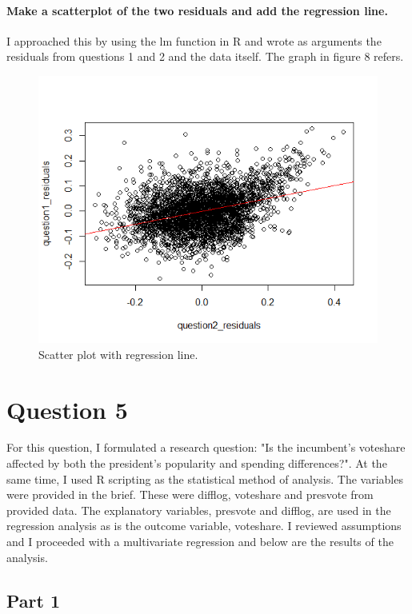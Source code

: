 \documentclass{article}
\begin{document}
\paragraph{Make a scatterplot of the two residuals and add the regression line.}
I approached this by using the lm function in R and wrote as arguments the residuals from questions 1 and 2 and the data itself. The graph in figure 8 refers.
\begin{figure}[h!]
	\centering
	\includegraphics[width=0.9\linewidth]{Question 4 - Scatter Plot with regression line.png}
	\caption{Scatter plot with regression line.}
	\label{fig:Scatter plot with regression line}
\end{figure}



	\section{Question 5}

For this question, I formulated a research question: "Is the incumbent's voteshare affected by both the president's popularity and spending differences?". At the same time, I used R scripting as the statistical method of analysis. The variables were provided in the brief. These were difflog, voteshare and presvote from provided data. The explanatory variables, presvote and difflog, are used in the regression analysis as is the outcome variable, voteshare. I reviewed assumptions and I proceeded with a multivariate regression and below are the results of the analysis.   
\subsection{Part 1}
\end{document}
